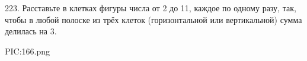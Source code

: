 223. Расставьте в клетках фигуры числа от 2 до 11, каждое по одному разу, так, чтобы в любой полоске из трёх клеток (горизонтальной или вертикальной) сумма делилась на 3.
\begin{center}
{{PIC:166.png}}
\end{center}
